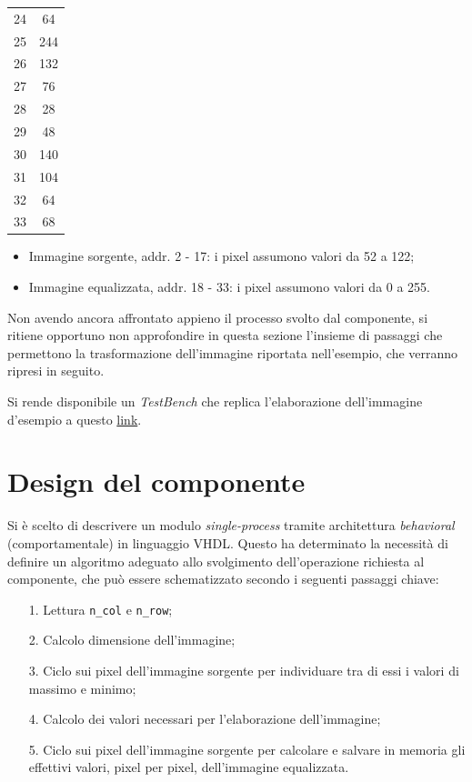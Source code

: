\documentclass{article}
\begin{document}
\begin{table}[h]
\begin{tabular}{c|c}
        24    & 64   \\
        25    & 244  \\
        26    & 132  \\
        27    & 76   \\
        28    & 28   \\
        29    & 48   \\
        30    & 140  \\
        31    & 104  \\
        32    & 64   \\
        33    & 68   \\
    \end{tabular}
\end{table}

\begin{itemize}
    \item Immagine sorgente, addr. 2 - 17: i pixel assumono valori da 52 a 122;
    \item Immagine equalizzata, addr. 18 - 33: i pixel assumono valori da 0 a 255.
\end{itemize}

Non avendo ancora affrontato appieno il processo svolto dal componente, si ritiene opportuno non approfondire in questa sezione
l'insieme di passaggi che permettono la trasformazione dell'immagine riportata nell'esempio, che verranno ripresi in seguito. \par
Si rende disponibile un \emph{TestBench} che replica l'elaborazione dell'immagine d'esempio a questo \href{https://polimi365-my.sharepoint.com/:f:/g/personal/10628782_polimi_it/EgwOb4V2Oj5Cnx3qEVuZ200BZdZsEs7zgI2Tc3eQFnCPpg?e=h7xHbB}{link}.

\pagebreak

\section{Design del componente} %
Si è scelto di descrivere un modulo \emph{single-process} tramite architettura \emph{behavioral} (comportamentale) in linguaggio VHDL.
Questo ha determinato la necessità di definire un algoritmo adeguato allo svolgimento dell’operazione richiesta al componente, che può essere schematizzato secondo i seguenti passaggi chiave:
\begin{itemize}
    \item   [1.]    Lettura \texttt{n\_col} e \texttt{n\_row};
    \item   [2.]    Calcolo dimensione dell'immagine;
    \item   [3.]    Ciclo sui pixel dell’immagine sorgente per individuare tra di essi i valori di massimo e minimo;
    \item   [4.]    Calcolo dei valori necessari per l’elaborazione dell’immagine;
    \item   [5.]    Ciclo sui pixel dell’immagine sorgente per calcolare e salvare in memoria gli effettivi valori, pixel per pixel, dell’immagine equalizzata.
\end{itemize}
\end{document}
